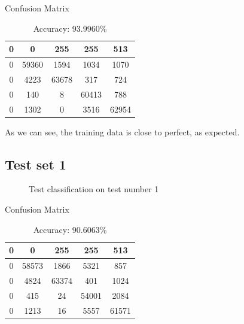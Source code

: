 \documentclass{article}
\begin{document}
\vspace{10px}
\begin{table}[h!]%
\centering
Confusion Matrix\\
\begin{tabular}{c | c | c | c | c}
 0  & 0     & 255   & 255   & 513 \\\hline
 0  & 59360 & 1594  & 1034  & 1070 \\\hline
 0  & 4223  & 63678 & 317   & 724 \\\hline
 0  & 140   & 8     & 60413 & 788 \\\hline
 0  & 1302  & 0     & 3516  & 62954 \\\hline
\end{tabular}
\caption {Accuracy: 93.9960\%}
\end{table}

	As we can see, the training data is close to perfect, as expected. 
		
	\newpage
\subsection{Test set 1}
	\begin{figure}[h!]%
		\centering
    	\caption{Test classification on test number 1}%
    	\label{fig:f1}%
	\end{figure}
\begin{table}[h!]%
\centering
Confusion Matrix\\
\begin{tabular}{c | c | c | c | c}
 0  & 0     & 255   & 255   & 513   \\\hline
 0  & 58573 & 1866  & 5321  & 857   \\\hline
 0  & 4824  & 63374 & 401   & 1024  \\\hline
 0  & 415   & 24    & 54001 & 2084  \\\hline
 0  & 1213  & 16    & 5557  & 61571 \\\hline
\end{tabular}
\caption {Accuracy: 90.6063\%}
\end{table}
\end{document}
